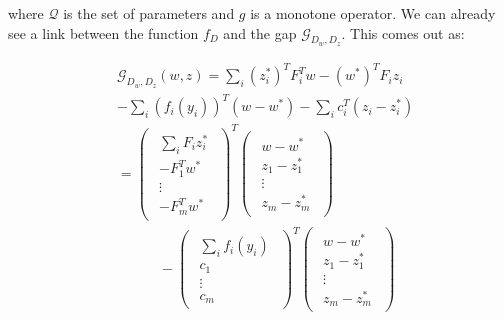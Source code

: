 \documentclass{article}
\begin{document}
where $\mathcal{Q}$ is the set of parameters and $g$ is a monotone
operator. We can already see a link between the function $f_D$ and the gap
$\mathcal{G}_{D_{ w}, D_{ z}}$. This comes out as:

\begin{equation}
  \begin{aligned}
    &\mathcal{G}_{D_{ w},D_{ z}}( w,  z) = \sum_i ( z_i^*)^T  F_i^T  w - ( w^*)^T  F_i  z_i \\
    &- \sum_i  ( f_i ( y_i))^T ( w -  w^*)- \sum_i  c_i^T ( z_i -  z_i^*)\\
    &=  
    \begin{pmatrix}
      \begin{array}{c}
        \sum_i  F_i  z_i^*\\
	- F_1^T  w^*\\
	\vdots\\
	- F_m^T  w^*
      \end{array}
    \end{pmatrix}^T 
    \begin{pmatrix}
      \begin{array}{c}
	 w -  w^*\\
	 z_1 -  z_1^*\\
	\vdots\\
	 z_m -  z_m^*
      \end{array}
    \end{pmatrix}\\
    &\quad\quad\quad-\begin{pmatrix}
      \begin{array}{c}
	\sum_i  f_i( y_i)\\
	 c_1\\
	\vdots\\
	 c_m
      \end{array}
    \end{pmatrix}^T
    \begin{pmatrix}
      \begin{array}{c}
	 w -  w^*\\
	 z_1 -  z_1^*\\
	\vdots\\
	 z_m -  z_m^*
      \end{array}
    \end{pmatrix}
  \end{aligned}
\end{equation}
\end{document}
